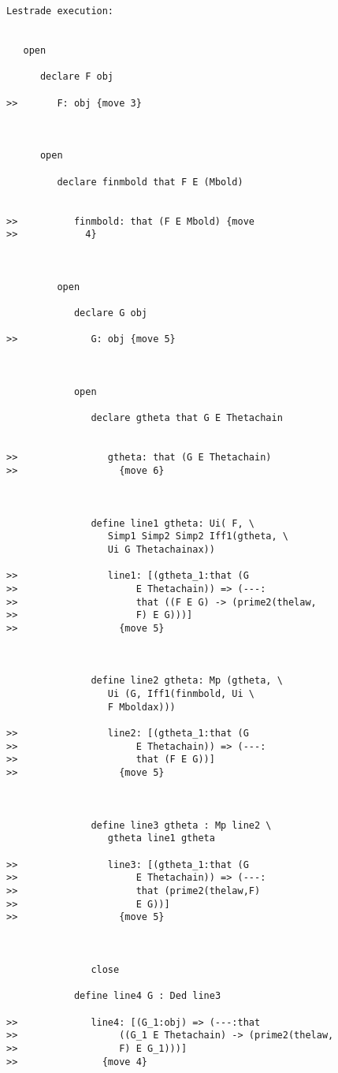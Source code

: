 \documentclass[12pt]{article}
\begin{document}
\begin{verbatim}Lestrade execution:


   open

      declare F obj

>>       F: obj {move 3}



      open

         declare finmbold that F E (Mbold)


>>          finmbold: that (F E Mbold) {move
>>            4}



         open

            declare G obj

>>             G: obj {move 5}



            open

               declare gtheta that G E Thetachain


>>                gtheta: that (G E Thetachain)
>>                  {move 6}



               define line1 gtheta: Ui( F, \
                  Simp1 Simp2 Simp2 Iff1(gtheta, \
                  Ui G Thetachainax))

>>                line1: [(gtheta_1:that (G
>>                     E Thetachain)) => (---:
>>                     that ((F E G) -> (prime2(thelaw,
>>                     F) E G)))]
>>                  {move 5}



               define line2 gtheta: Mp (gtheta, \
                  Ui (G, Iff1(finmbold, Ui \
                  F Mboldax)))

>>                line2: [(gtheta_1:that (G
>>                     E Thetachain)) => (---:
>>                     that (F E G))]
>>                  {move 5}



               define line3 gtheta : Mp line2 \
                  gtheta line1 gtheta

>>                line3: [(gtheta_1:that (G
>>                     E Thetachain)) => (---:
>>                     that (prime2(thelaw,F)
>>                     E G))]
>>                  {move 5}



               close

            define line4 G : Ded line3

>>             line4: [(G_1:obj) => (---:that
>>                  ((G_1 E Thetachain) -> (prime2(thelaw,
>>                  F) E G_1)))]
>>               {move 4}




\end{verbatim}
\end{document}
